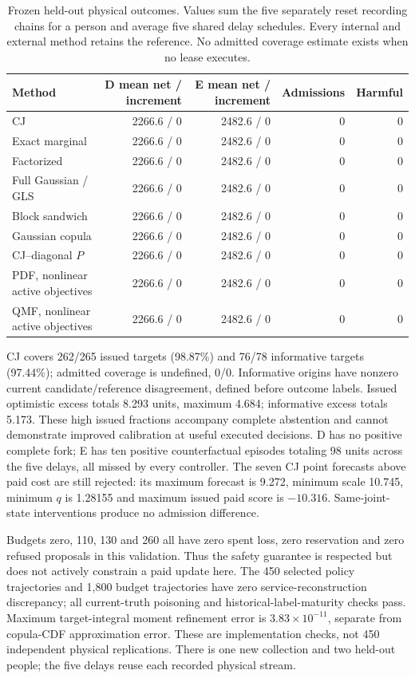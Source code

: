 \documentclass[10pt]{article}
\begin{document}
\begin{table}[t]
\centering\small
\caption{Frozen held-out physical outcomes. Values sum the five separately
reset recording chains for a person and average five shared delay schedules.
Every internal and external method retains the reference. No admitted
coverage estimate exists when no lease executes.}
\label{tab:new-physical-results}
\begin{tabular}{lrrrr}
\toprule
Method & D mean net / increment & E mean net / increment & Admissions & Harmful\\
\midrule
CJ & 2266.6 / 0 & 2482.6 / 0 & 0 & 0\\
Exact marginal & 2266.6 / 0 & 2482.6 / 0 & 0 & 0\\
Factorized & 2266.6 / 0 & 2482.6 / 0 & 0 & 0\\
Full Gaussian / GLS & 2266.6 / 0 & 2482.6 / 0 & 0 & 0\\
Block sandwich & 2266.6 / 0 & 2482.6 / 0 & 0 & 0\\
Gaussian copula & 2266.6 / 0 & 2482.6 / 0 & 0 & 0\\
CJ--diagonal $P$ & 2266.6 / 0 & 2482.6 / 0 & 0 & 0\\
PDF, nonlinear active objectives & 2266.6 / 0 & 2482.6 / 0 & 0 & 0\\
QMF, nonlinear active objectives & 2266.6 / 0 & 2482.6 / 0 & 0 & 0\\
\bottomrule
\end{tabular}
\end{table}

CJ covers 262/265 issued targets (98.87\%) and 76/78 informative targets
(97.44\%); admitted coverage is undefined, 0/0. Informative origins have
nonzero current candidate/reference disagreement, defined before outcome
labels. Issued optimistic excess totals 8.293 units, maximum 4.684;
informative excess totals 5.173. These high issued fractions accompany
complete abstention and cannot demonstrate improved calibration at useful
executed decisions. D has no positive complete fork; E has ten positive
counterfactual episodes totaling 98 units across the five delays, all missed
by every controller. The seven CJ point forecasts above paid cost are
still rejected: its maximum forecast is 9.272, minimum scale 10.745,
minimum $q$ is 1.28155 and maximum issued paid score is $-10.316$.
Same-joint-state interventions produce no admission difference.

Budgets zero, 110, 130 and 260 all have zero spent loss, zero reservation
and zero refused proposals in this validation. Thus the safety guarantee
is respected but does not actively constrain a paid update here.
The 450 selected policy trajectories and 1,800 budget trajectories have
zero service-reconstruction discrepancy; all current-truth poisoning and
historical-label-maturity checks pass. Maximum target-integral moment
refinement error is $3.83\times10^{-11}$, separate from copula-CDF
approximation error. These are implementation checks, not 450 independent
physical replications. There is one new collection and two held-out people;
the five delays reuse each recorded physical stream.
\end{document}
